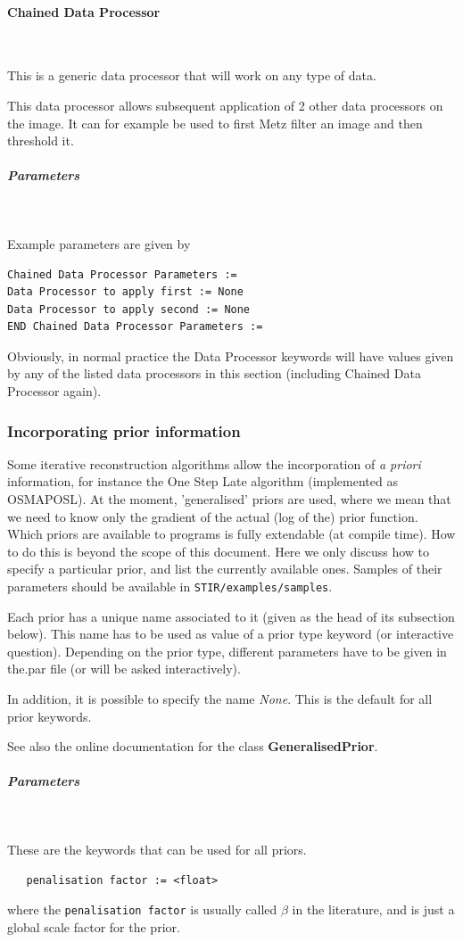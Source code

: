 \documentclass{article}
\newcommand{\subsubsubsection}[1]{\paragraph{#1}\mbox{} \\}
\newcommand{\subsubsubsubsection}[1]{\subparagraph{#1} \mbox{} \\}
\begin{document}
{{{ \subsubsubsection{Chained Data Processor}
}
This is a generic data processor that will work on any type of data.

This data processor allows subsequent application of 2 other 
data processors on the image. It can for example be used to 
first Metz filter an image and then threshold it.

{ \subsubsubsubsection{Parameters}
}
Example parameters are given by
\begin{verbatim}
Chained Data Processor Parameters :=
Data Processor to apply first := None
Data Processor to apply second := None
END Chained Data Processor Parameters :=
\end{verbatim}

Obviously, in normal practice the Data Processor keywords will 
have values given by any of the listed data processors in this 
section (including Chained Data Processor again).



\subsubsection{
Incorporating prior information}
\label{sec:priors}
Some iterative reconstruction algorithms allow the incorporation 
of \textit{a priori} information, for instance the One Step Late algorithm 
(implemented as OSMAPOSL). At the moment, 'generalised' priors 
are used, where we mean that we need to know only the gradient 
of the actual (log of the) prior function.\\
Which priors are available to programs is fully extendable (at 
compile time). How to do this is beyond the scope of this document. 
Here we only discuss how to specify a particular prior, and list 
the currently available ones. Samples of their parameters should 
be available in \texttt{STIR/examples/samples}.



Each prior has a unique name associated to it (given as the head 
of its subsection below). This name has to be used as value of 
a prior type keyword (or interactive question). Depending on 
the prior type, different parameters have to be given in the.par 
file (or will be asked interactively).


In addition, it is possible to specify the name \textit{None}. This 
is the default for all prior keywords.


See also the online documentation for the class \textbf{GeneralisedPrior}.


{ \subsubsubsubsection{Parameters}
}
These are the keywords that can be used for all priors.
  \begin{verbatim}
   penalisation factor := <float>
  \end{verbatim}
  \noindent where the \texttt{penalisation factor} is usually called
  $\beta$ in the literature, and is just a global scale factor for the
  prior.

}}
\end{document}
